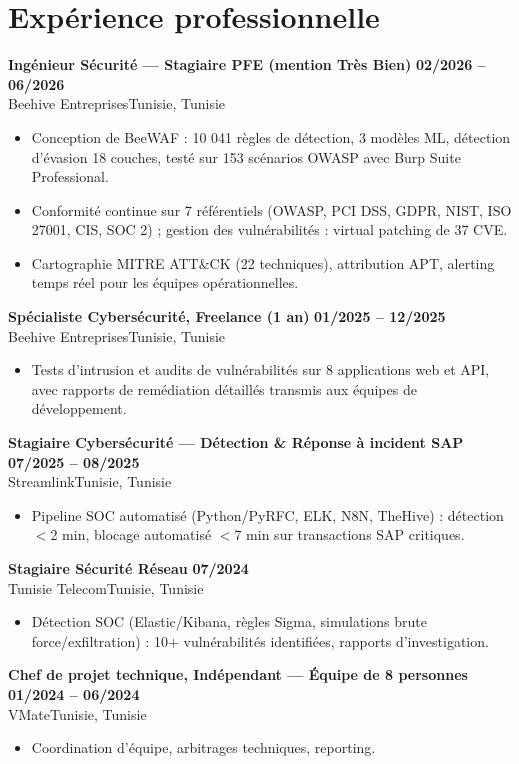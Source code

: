 \documentclass[a4paper,9pt]{article}
\newcommand{\cventry}[4]{\textbf{#1} \hfill \textbf{#4}\\[0.2pt]#2{\ifx\relax#3\relax\else, #3\fi}\par\vspace{0.3pt}}
\begin{document}
\section{Expérience professionnelle}
\cventry{Ingénieur Sécurité --- Stagiaire PFE (mention Très Bien)}{Beehive Entreprises}{Tunisie}{02/2026 -- 06/2026}
\begin{itemize}
  \item Conception de BeeWAF : 10 041 règles de détection, 3 modèles ML, détection d'évasion 18 couches, testé sur 153 scénarios OWASP avec Burp Suite Professional.
  \item Conformité continue sur 7 référentiels (OWASP, PCI DSS, GDPR, NIST, ISO 27001, CIS, SOC 2) ; gestion des vulnérabilités : virtual patching de 37 CVE.
  \item Cartographie MITRE ATT\&CK (22 techniques), attribution APT, alerting temps réel pour les équipes opérationnelles.
\end{itemize}
\cventry{Spécialiste Cybersécurité, Freelance (1 an)}{Beehive Entreprises}{Tunisie}{01/2025 -- 12/2025}
\begin{itemize}
  \item Tests d'intrusion et audits de vulnérabilités sur 8 applications web et API, avec rapports de remédiation détaillés transmis aux équipes de développement.
\end{itemize}
\cventry{Stagiaire Cybersécurité --- Détection \& Réponse à incident SAP}{Streamlink}{Tunisie}{07/2025 -- 08/2025}
\begin{itemize}
  \item Pipeline SOC automatisé (Python/PyRFC, ELK, N8N, TheHive) : détection $<$2 min, blocage automatisé $<$7 min sur transactions SAP critiques.
\end{itemize}
\cventry{Stagiaire Sécurité Réseau}{Tunisie Telecom}{Tunisie}{07/2024}
\begin{itemize}
  \item Détection SOC (Elastic/Kibana, règles Sigma, simulations brute force/exfiltration) : 10+ vulnérabilités identifiées, rapports d'investigation.
\end{itemize}
\cventry{Chef de projet technique, Indépendant --- Équipe de 8 personnes}{VMate}{Tunisie}{01/2024 -- 06/2024}
\begin{itemize}
  \item Coordination d'équipe, arbitrages techniques, reporting.
\end{itemize}
\end{document}
